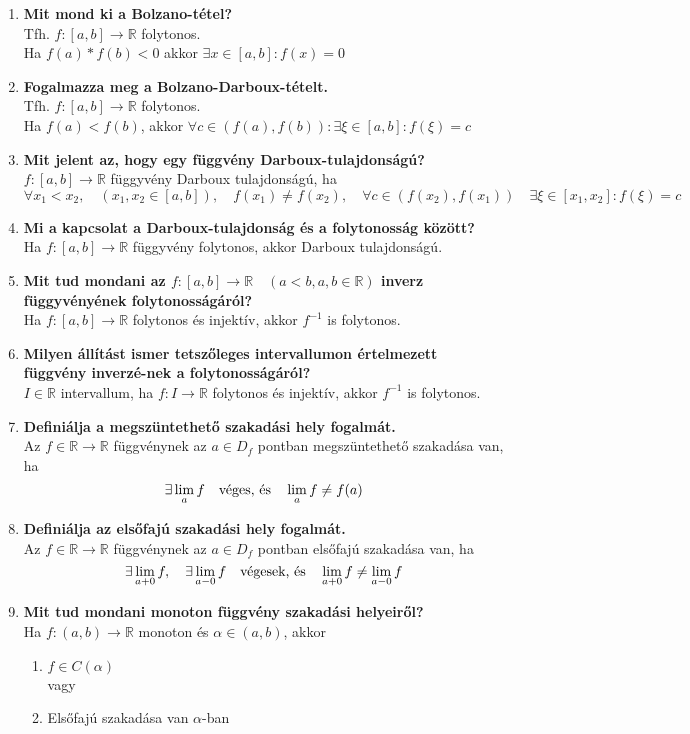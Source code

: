 \documentclass[a4paper,11pt]{article}
\begin{document}
\def\R{\mathbb{R}}
\begin{enumerate}
	\item \textbf{Mit mond ki a Bolzano-tétel?}\\[0.1cm]
	Tfh. $f: [a,b] \to \R$ folytonos.\\[0.1cm] Ha $f(a)*f(b) < 0$ akkor $\exists x \in [a,b]: f(x) = 0$
	\item \textbf{Fogalmazza meg a Bolzano-Darboux-tételt.}\\[0.1cm]
	Tfh. $f: [a,b]\to\R$ folytonos.\\[0.1cm] Ha $f(a) < f(b)$, akkor $\forall c \in (f(a),f(b)): \exists \xi \in [a,b]: f(\xi) = c$
	\item \textbf{Mit jelent az, hogy egy függvény Darboux-tulajdonságú?}\\[0.1cm]
	$f:[a,b]\to\R$ függyvény Darboux tulajdonságú, ha\\ $\forall x_1<x_2,\quad (x_1,x_2\in[a,b]), \quad f(x_1) \neq f(x_2), \quad \forall c \in(f(x_2),f(x_1)) \quad \exists \xi \in [x_1,x_2]: f(\xi)=c$
	\item \textbf{Mi a kapcsolat a Darboux-tulajdonság és a folytonosság között?}\\[0.1cm]
	Ha $f:[a,b]\to\R$ függyvény folytonos, akkor Darboux tulajdonságú.
	\item \textbf{Mit tud mondani az $f:[a,b]\to\R\quad(a<b,a,b\in\R)$ inverz függyvényének folytonosságáról?}\\[0.1cm]
	Ha $f:[a,b]\to\R$ folytonos és injektív, akkor $f^{-1}$ is folytonos.
	\item \textbf{Milyen állítást ismer tetszőleges intervallumon értelmezett függvény inverzé-nek a folytonosságáról?}\\[0.1cm]
	$I\in\R$ intervallum, ha $f:I\to\R$ folytonos és injektív, akkor $f^{-1}$ is folytonos.
	\item \textbf{Definiálja a megszüntethető szakadási hely fogalmát.}\\[0.1cm]
	Az $f\in\R\to\R$ függvénynek az $a\in D_f$ pontban megszüntethető szakadása van, ha \[ \exists\lim_{a} f\text{\quad véges, és\quad } \lim_a f\not=f(a)\]
	\item \textbf{Definiálja az elsőfajú szakadási hely fogalmát.}\\[0.1cm]
	Az $f\in\R\to\R$ függvénynek az $a\in D_f$ pontban elsőfajú szakadása van, ha \[ \exists \lim_{a+0} f,\quad \exists\lim_{a-0}f \text{\quad végesek, és\quad } \lim_{a+0} f \not= \lim_{a-0}f \]
	\item \textbf{Mit tud mondani monoton függvény szakadási helyeiről?}\\[0.1cm]
	Ha $f:(a,b)\to\R$ monoton és $\alpha\in(a,b)$, akkor
	\begin{enumerate}
		\item $f\in C(\alpha)$\\[0.1cm] \hspace*{0.1cm} vagy
		\item Elsőfajú szakadása van $\alpha$-ban
	\end{enumerate}
\end{enumerate}
\end{document}
